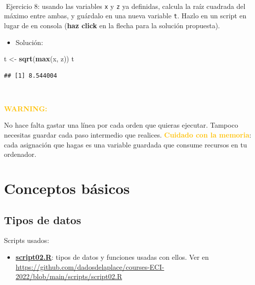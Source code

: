 \documentclass[11pt,]{book}
\newenvironment{Shaded}{\begin{snugshade}}{\end{snugshade}}
\newcommand{\KeywordTok}[1]{\textcolor[rgb]{0.27,0.27,0.27}{\textbf{#1}}}
\newcommand{\NormalTok}[1]{#1}
\newcommand{\StringTok}[1]{\textcolor[rgb]{0.5,0.5,0.5}{#1}}
\providecommand{\tightlist}{%
  \setlength{\itemsep}{0pt}\setlength{\parskip}{0pt}}
\begin{document}
~

📝Ejercicio 8: usando las variables \texttt{x} y \texttt{z} ya definidas, calcula la raíz cuadrada del máximo entre ambas, y guárdalo en una nueva variable \texttt{t}. Hazlo en un script en lugar de en consola (\textbf{haz click} en la flecha para la solución propuesta).

\begin{itemize}
\tightlist
\item
  Solución:
\end{itemize}

\begin{Shaded}
\begin{Highlighting}[]
\NormalTok{t <-}\StringTok{ }\KeywordTok{sqrt}\NormalTok{(}\KeywordTok{max}\NormalTok{(x, z)) }
\NormalTok{t}
\end{Highlighting}
\end{Shaded}

\begin{verbatim}
## [1] 8.544004
\end{verbatim}

~

\textbf{\textcolor{#ffc107}{WARNING:}}

No hace falta gastar una línea por cada orden que quieras ejecutar. Tampoco necesitas guardar cada paso intermedio que realices. \textbf{\textcolor{#ffc107}{Cuidado con la memoria}}: cada asignación que hagas es una variable guardada que consume recursos en tu ordenador.

\hypertarget{part-conceptos-buxe1sicos}{%
\part{Conceptos básicos}\label{part-conceptos-buxe1sicos}}

\hypertarget{tipos-datos}{%
\chapter{Tipos de datos}\label{tipos-datos}}

\begin{blackbox}

Scripts usados:

\begin{itemize}
\tightlist
\item
  \href{https://github.com/dadosdelaplace/courses-ECI-2022/blob/main/scripts/script02.R}{\textbf{script02.R}}: tipos de datos y funciones usadas con ellos. Ver en \url{https://github.com/dadosdelaplace/courses-ECI-2022/blob/main/scripts/script02.R}
\end{itemize}


\end{blackbox}
\end{document}
